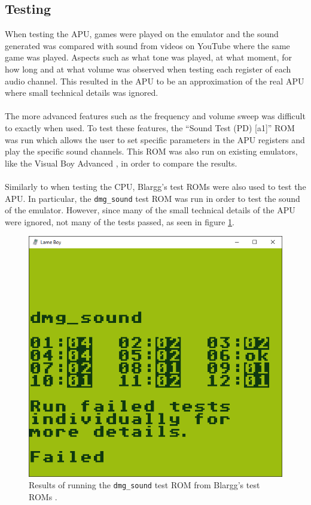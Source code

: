 \subsection{Testing}
When testing the APU, games were played on the emulator and the sound generated was compared with sound from videos on YouTube where the same game was played. Aspects such as what tone was played, at what moment, for how long and at what volume was observed when testing each register of each audio channel. This resulted in the APU to be an approximation of the real APU where small technical details was ignored.
\\\\
The more advanced features such as the frequency and volume sweep was difficult to exactly when used. To test these features, the ``Sound Test (PD) [a1]'' \cite{SountTestPD} ROM was run which allows the user to set specific parameters in the APU registers and play the specific sound channels. This ROM was also run on existing emulators, like the Visual Boy Advanced \cite{visualBoyAdvanced}, in order to compare the results.
\\\\
Similarly to when testing the CPU, Blargg's test ROMs \cite{Blargg} were also used to test the APU. In particular, the \texttt{dmg\_sound} test ROM was run in order to test the sound of the emulator. However, since many of the small technical details of the APU were ignored, not many of the tests passed, as seen in figure \ref{fig:blargg_dmg_sound}.

\begin{figure}[H]
    \centering
    \includegraphics[width=\textwidth/2]{figures/APU/blargg_dmg_sound.PNG}
    \caption{Results of running the \texttt{dmg\_sound} test ROM from Blargg's test ROMs \cite{Blargg}.}
    \label{fig:blargg_dmg_sound}
\end{figure}

